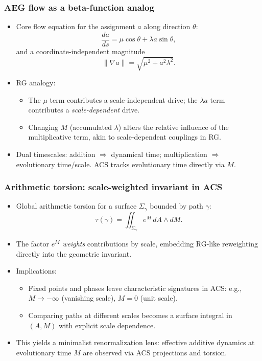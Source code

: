 \documentclass[aspectratio=169]{beamer}
\begin{document}
\begin{frame}
    \frametitle{AEG flow as a beta-function analog}
    \begin{itemize}
        \item Core flow equation for the assignment $a$ along direction $\theta$:
        \[
            \frac{da}{ds} = \mu \cos\theta + \lambda a \sin\theta,
        \]
        and a coordinate-independent magnitude
        \[
            \|\nabla a\| = \sqrt{\mu^2 + a^2\lambda^2}.
        \]
        \item RG analogy:
        \begin{itemize}
            \item The $\mu$ term contributes a scale-independent drive; the $\lambda a$ term contributes a \emph{scale-dependent} drive.
            \item Changing $M$ (accumulated $\lambda$) alters the relative influence of the multiplicative term, akin to scale-dependent couplings in RG.
        \end{itemize}
        \item Dual timescales: addition $\Rightarrow$ dynamical time; multiplication $\Rightarrow$ evolutionary time/scale. ACS tracks evolutionary time directly via $M$.
    \end{itemize}
\end{frame}

\begin{frame}
    \frametitle{Arithmetic torsion: scale-weighted invariant in ACS}
    \begin{itemize}
        \item Global arithmetic torsion for a surface $\Sigma_\gamma$ bounded by path $\gamma$:
        \[
            \tau(\gamma) = \iint_{\Sigma_\gamma} e^{M}\, dA \wedge dM.
        \]
        \item The factor $e^M$ \emph{weights} contributions by scale, embedding RG-like reweighting directly into the geometric invariant.
        \item Implications:
        \begin{itemize}
            \item Fixed points and phases leave characteristic signatures in ACS: e.g., $M\rightarrow -\infty$ (vanishing scale), $M=0$ (unit scale).
            \item Comparing paths at different scales becomes a surface integral in $(A,M)$ with explicit scale dependence.
        \end{itemize}
        \item This yields a minimalist renormalization lens: effective additive dynamics at evolutionary time $M$ are observed via ACS projections and torsion.
    \end{itemize}
\end{frame}
\end{document}
